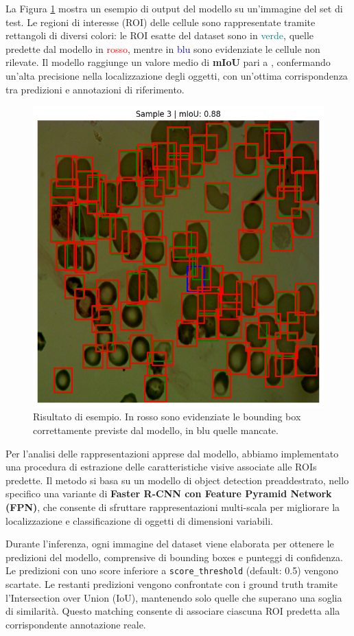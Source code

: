 \documentclass[minted, draw]{../tex/hebdomon}
\begin{document}
La Figura \ref{fig:detection_example} mostra un esempio di output del modello su un’immagine del set di test. Le regioni di interesse (ROI) delle cellule sono rappresentate tramite rettangoli di diversi colori: le ROI esatte del dataset sono in \textcolor{teal}{verde}, quelle predette dal modello in \textcolor{red}{rosso}, mentre in \textcolor{blue}{blu} sono evidenziate le cellule non rilevate. Il modello raggiunge un valore medio di \textbf{mIoU} pari a , confermando un’alta precisione nella localizzazione degli oggetti, con un’ottima corrispondenza tra predizioni e annotazioni di riferimento.
\begin{figure}[H]
  \centering
  \includegraphics[width=.6\linewidth]{figures/ex_result.png}
  \caption{Risultato di esempio. In rosso sono evidenziate le bounding box correttamente previste dal modello, in blu quelle mancate.}
  \label{fig:detection_example}
\end{figure}
%

Per l'analisi delle rappresentazioni apprese dal modello, abbiamo implementato una procedura di estrazione delle caratteristiche visive associate alle ROIs predette. Il metodo si basa su un modello di object detection preaddestrato, nello specifico una variante di \textbf{Faster R-CNN con Feature Pyramid Network (FPN)}, che consente di sfruttare rappresentazioni multi-scala per migliorare la localizzazione e classificazione di oggetti di dimensioni variabili.

Durante l'inferenza, ogni immagine del dataset viene elaborata per ottenere le predizioni del modello, comprensive di bounding boxes e punteggi di confidenza. Le predizioni con uno score inferiore a \texttt{score\_threshold} (default: 0.5) vengono scartate. Le restanti predizioni vengono confrontate con i ground truth tramite l'Intersection over Union (IoU), mantenendo solo quelle che superano una soglia di similarità. Questo matching consente di associare ciascuna ROI predetta alla corrispondente annotazione reale.
\end{document}
